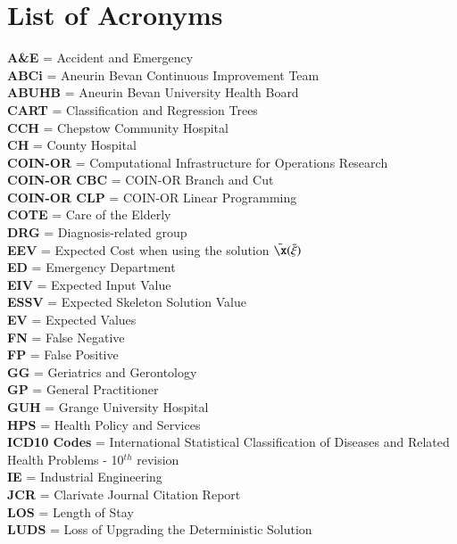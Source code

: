 \documentclass[../thesis.tex]{subfiles}
\begin{document}
\chapter*{\textbf{List of Acronyms}}
\textbf{A\&E} =	 Accident and Emergency\\
\textbf{ABCi} = Aneurin Bevan Continuous Improvement Team \\
\textbf{ABUHB} = 	 Aneurin Bevan University Health Board\\
\textbf{CART} =	 Classification and Regression Trees\\
\textbf{CCH } = Chepstow Community Hospital\\
\textbf{CH} = County Hospital\\
\textbf{COIN-OR} = 	 Computational Infrastructure for Operations Research\\
\textbf{COIN-OR CBC } =	 COIN-OR Branch and Cut\\
\textbf{COIN-OR CLP} =  	 COIN-OR Linear Programming\\
\textbf{COTE} =  	 Care of the Elderly \\
\textbf{DRG} =  	 Diagnosis-related group\\
\textbf{EEV} =  	 Expected Cost when using the solution $\bar \x(\bar \xi)$ \\
\textbf{ED} = Emergency Department\\
\textbf{EIV} =  	 Expected Input Value\\
\textbf{ESSV} =  	 Expected Skeleton Solution Value\\
\textbf{EV} =  	 Expected Values\\
\textbf{FN} = False Negative\\
\textbf{FP} = False Positive\\
\textbf{GG} = Geriatrics and Gerontology \\
\textbf{GP} = General Practitioner\\
\textbf{GUH} =  	 Grange University Hospital\\
\textbf{HPS} = Health Policy and Services \\
\textbf{ICD10 Codes} =  International Statistical Classification of Diseases and Related Health Problems - 10$^{th}$ revision\\
\textbf{IE} = Industrial Engineering\\
\textbf{JCR} = Clarivate Journal Citation Report\\
\textbf{LOS} =  	 Length of Stay\\
\textbf{LUDS} =  	 Loss of Upgrading the Deterministic Solution\\
\end{document}

